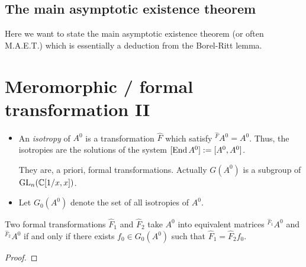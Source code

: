 \subsection{The main asymptotic existence theorem}
\begin{comment}
  \begin{multicols}{2}
    \textbf{Classical:}
    \begin{itemize}
      \item \cite[Thm.4.4.1]{Loday2014}
      \item \cite[Thm.7.10]{van2003galois}{\tiny\cite[Thm.7.12]{van2003galois}}
      \item \cite[Thm.12.1]{wasow2002asymptotic}
      \item \cite[5.3.Thm.1]{Varadarajan96linearmeromorphic}
    \end{itemize}
  \columnbreak
    \textbf{Sheafical:}
    \begin{itemize}
      \item \cite[Thm.2.3.1]{sabbah_cimpa90}
    \end{itemize}
  \end{multicols}
\end{comment}
Here we want to state the main asymptotic existence theorem (or often M.A.E.T.)
which is essentially a deduction from the Borel-Ritt lemma.

\section{Meromorphic / formal transformation II}
\begin{defn}
  \begin{itemize}
    \item An \emph{isotropy} of $A^0$ is a transformation $\hat F$ which
      satisfy ${}^{\hat F}\!A^0=A^0$.
      Thus, the isotropies are the solutions of the system
      $[\operatorname{End} A^0]:=[A^0,A^0]$.
      \begin{rem}
        They are, a priori, formal transformations. Actually $G(A^0)$ is a
        subgroup of $\operatorname{GL}_n(\mathbb{C}[1/x,x])$.
      \end{rem}
    \item Let $G_0(A^0)$ denote the set of all isotropies of $A^0$.
      \begin{comment}
        In the nice case this is only $T$?
      \end{comment}
  \end{itemize}
\end{defn}
\begin{lem}
  Two formal transformations $\hat F_1$ and $\hat F_2$ take $A^0$ into
  equivalent matrices ${}^{\hat F_1}\!A^0$ and  ${}^{\hat F_2}\!A^0$ if and
  only if there exists $f_0\in G_0(A^0)$ such that $\hat F_1=\hat F_2f_0$.
\end{lem}
\begin{proof}
  \TODO{}
\end{proof}


